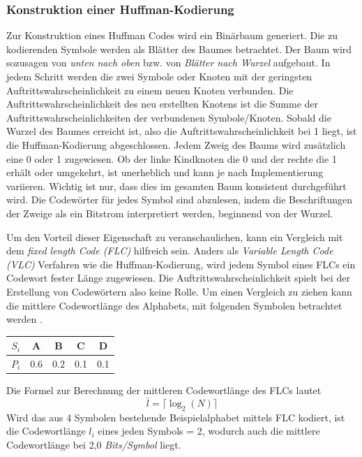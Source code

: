 \subsubsection{Konstruktion einer Huffman-Kodierung}
\label{subsubsec:konstruktion_huffman}
Zur Konstruktion eines Huffman Codes wird ein Binärbaum generiert.
Die zu kodierenden Symbole werden als Blätter des Baumes betrachtet.
Der Baum wird sozusagen von \textit{unten nach oben} bzw. von \textit{Blätter nach Wurzel} aufgebaut. \newline
In jedem Schritt werden die zwei Symbole oder Knoten mit der geringsten Auftrittswahrscheinlichkeit zu einem neuen Knoten verbunden.
Die Auftrittswahrscheinlichkeit des neu erstellten Knotens ist die Summe der Auftrittswahrscheinlichkeiten der verbundenen Symbole/Knoten.
Sobald die Wurzel des Baumes erreicht ist, also die Auftrittswahrscheinlichkeit bei 1 liegt, ist die Huffman-Kodierung abgeschlossen.
Jedem Zweig des Baums wird zusätzlich eine 0 oder 1 zugewiesen.
Ob der linke Kindknoten die 0 und der rechte die 1 erhält oder umgekehrt, ist unerheblich und kann je nach Implementierung variieren.
Wichtig ist nur, dass dies im gesamten Baum konsistent durchgeführt wird.
Die Codewörter für jedes Symbol sind abzulesen, indem die Beschriftungen der Zweige als ein Bitstrom interpretiert werden, beginnend von der Wurzel.

Um den Vorteil dieser Eigenschaft zu veranschaulichen, kann ein Vergleich mit dem \textit{fixed length Code (FLC)} hilfreich sein.
Anders als \textit{Variable Length Code (VLC)} Verfahren wie die Huffman-Kodierung, wird jedem Symbol eines FLCs ein Codewort fester Länge zugewiesen.
Die Auftrittswahrscheinlichkeit spielt bei der Erstellung von Codewörtern also keine Rolle.
Um einen Vergleich zu ziehen kann die mittlere Codewortlänge des Alphabets, mit folgenden Symbolen betrachtet werden \cite{Moffat2019}.

\begin{table}[h]
\centering
\begin{tabular}{ccccc}
\toprule
\textbf{\textit{\(S_i\)}} & {A} & {B} & {C} & {D} \\
\midrule
\textbf{\textit{\(P_i\)}} & 0.6 & 0.2 & 0.1 & 0.1\\
\bottomrule
\end{tabular}
\end{table}

Die Formel zur Berechnung der mittleren Codewortlänge des FLCs lautet
\begin{equation*}
\bar{l} = \lceil \log_2(N) \rceil
\end{equation*}
Wird das aus 4 Symbolen bestehende Beispielalphabet mittels FLC kodiert, ist die Codewortlänge \(l_i\) eines jeden Symbols = 2, wodurch auch die mittlere Codewortlänge bei 2,0 \textit{Bits/Symbol} liegt.

